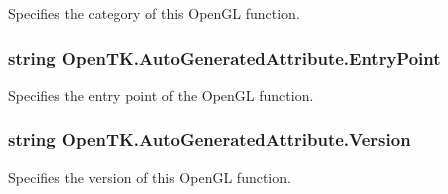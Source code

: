 Specifies the category of this Open\-G\-L function. 

\hypertarget{class_open_t_k_1_1_auto_generated_attribute_ac30396fa02f88714f2d7b343e9d965c3}{
\subsubsection[{Entry\-Point}]{\setlength{\rightskip}{0pt plus 5cm}string Open\-T\-K.\-Auto\-Generated\-Attribute.\-Entry\-Point}}\label{class_open_t_k_1_1_auto_generated_attribute_ac30396fa02f88714f2d7b343e9d965c3}


Specifies the entry point of the Open\-G\-L function. 

\hypertarget{class_open_t_k_1_1_auto_generated_attribute_a4def6ef24fb3d01fbde483d81d57edc9}{
\subsubsection[{Version}]{\setlength{\rightskip}{0pt plus 5cm}string Open\-T\-K.\-Auto\-Generated\-Attribute.\-Version}}\label{class_open_t_k_1_1_auto_generated_attribute_a4def6ef24fb3d01fbde483d81d57edc9}


Specifies the version of this Open\-G\-L function. 

